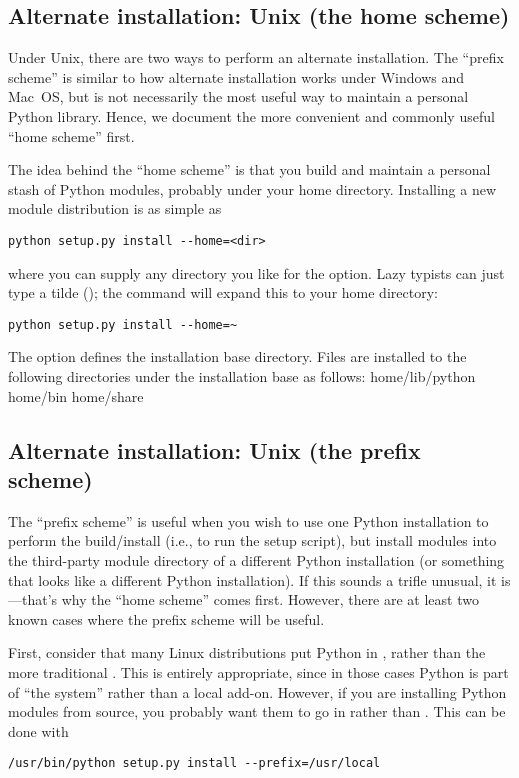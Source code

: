 \documentclass{howto}
\begin{document}
\subsection{Alternate installation: Unix (the home scheme)}
\label{alt-install-prefix}

Under Unix, there are two ways to perform an alternate installation.
The ``prefix scheme'' is similar to how alternate installation works
under Windows and Mac~OS, but is not necessarily the most useful way to
maintain a personal Python library.  Hence, we document the more
convenient and commonly useful ``home scheme'' first.

The idea behind the ``home scheme'' is that you build and maintain a
personal stash of Python modules, probably under your home directory.
Installing a new module distribution is as simple as
\begin{verbatim}
python setup.py install --home=<dir>
\end{verbatim}
where you can supply any directory you like for the 
option.  Lazy typists can just type a tilde (\code{\textasciitilde}); the
 command will expand this to your home directory:
\begin{verbatim}
python setup.py install --home=~
\end{verbatim}

The  option defines the installation base
directory.  Files are installed to the following directories under the
installation base as follows:
              {home}{/lib/python}
              {home}{/bin}
              {home}{/share}

\subsection{Alternate installation: Unix (the prefix scheme)}
\label{alt-install-home}

The ``prefix scheme'' is useful when you wish to use one Python
installation to perform the build/install (i.e., to run the setup
script), but install modules into the third-party module directory of a
different Python installation (or something that looks like a different
Python installation).  If this sounds a trifle unusual, it is---that's
why the ``home scheme'' comes first.  However, there are at least two
known cases where the prefix scheme will be useful.

First, consider that many Linux distributions put Python in ,
rather than the more traditional .  This is entirely
appropriate, since in those cases Python is part of ``the system''
rather than a local add-on.  However, if you are installing Python
modules from source, you probably want them to go in
 rather than
.  This can be done with
\begin{verbatim}
/usr/bin/python setup.py install --prefix=/usr/local
\end{verbatim}
\end{document}
